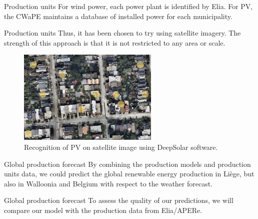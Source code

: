 \documentclass[12pt]{beamer}
\begin{document}
\begin{frame}{Production units}
    For wind power, each power plant is identified by \alert{Elia}. For PV, the \alert{CWaPE} maintains a database of installed power for each municipality. 
\end{frame}

\begin{frame}{Production units}
    Thus, it has been chosen to try using \alert{satellite imagery}. The strength of this approach is that it is not restricted to any area or scale.
    \begin{figure}
        \centering
        \includegraphics[width=0.6\textwidth]{resources/satellite.jpg}
        \caption*{Recognition of PV on satellite image using \alert{DeepSolar} software. \cite{deepsolar}}
    \end{figure}
\end{frame}

\begin{frame}{Global production forecast}
    By combining the production models and production units data, we could predict the global renewable energy production in Liège, but also in Walloonia and Belgium with respect to the \alert{weather forecast}.
    
\end{frame}
\begin{frame}{Global production forecast}
    To assess the quality of our predictions, we will compare our model with the production data from \alert{Elia}/\alert{APERe}\footnotemark[1].

\end{frame}
\end{document}
